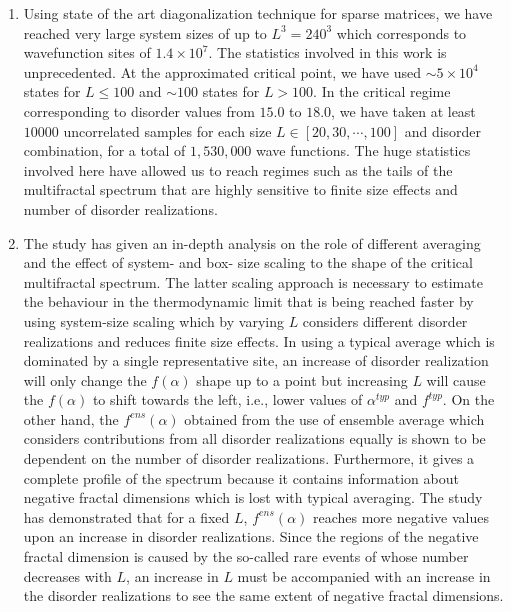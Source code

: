 \begin{enumerate}

\item 
Using state of the art diagonalization technique for sparse matrices, we have reached very large system sizes of up to 		
$L^3=240^3$ which corresponds to wavefunction sites of $1.4\times 10^7$.  The statistics involved in this work is unprecedented.  
At the approximated critical point, we have used $\sim 5\times 10^4$ states for $L\leqslant100$ and $\sim 100$ states for $L> 100$.  
In the critical regime corresponding to disorder values from $15.0$ to $18.0$, we have taken at least $10000$ uncorrelated samples for each size $L\in [20,30,\cdots,100]$ and disorder combination, for a total of $1,530,000$ wave functions.
%
The huge statistics involved here have allowed us to reach regimes such as the tails of the multifractal spectrum that are highly sensitive to finite size effects and number of disorder realizations.

\item
The study has given an in-depth analysis on the role of different averaging and the effect of system- and box- size scaling to the shape of the critical multifractal spectrum.  The latter scaling approach is necessary to estimate the behaviour in the thermodynamic limit that is being reached faster by using system-size scaling which by varying $L$ considers different disorder realizations and reduces finite size effects.
%
In using a typical average which is dominated by a single representative site, an increase of disorder realization will only change the $f(\alpha)$ shape up to a point but increasing $L$ will cause the $f(\alpha)$ to shift towards the left, i.e., lower values of $\alpha^{typ}$ and $f^{typ}$.
%
On the other hand, the $f^{ens}(\alpha)$ obtained from the use of ensemble average which considers contributions from all disorder realizations equally is shown to be dependent on the number of disorder realizations.  Furthermore, it gives a complete profile of the spectrum because it contains information about negative fractal dimensions which is lost with typical averaging.  The study has demonstrated that for a fixed $L$,
$f^{ens}(\alpha)$ reaches more negative values upon an increase in disorder realizations.  Since the regions of the negative fractal dimension is caused by the so-called rare events of whose number decreases with $L$, an increase in $L$ must be accompanied with an increase in the disorder realizations to see the same extent of negative fractal dimensions.


\end{enumerate}
